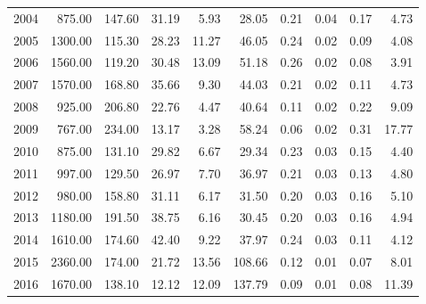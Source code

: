 \documentclass{article}
\begin{document}
\begin{table}[H]
\begin{tabular}{rrrrrrrrrr}
  2004 & 875.00 & 147.60 & 31.19 & 5.93 & 28.05 & 0.21 & 0.04 & 0.17 & 4.73 \\
  2005 & 1300.00 & 115.30 & 28.23 & 11.27 & 46.05 & 0.24 & 0.02 & 0.09 & 4.08 \\
  2006 & 1560.00 & 119.20 & 30.48 & 13.09 & 51.18 & 0.26 & 0.02 & 0.08 & 3.91 \\
  2007 & 1570.00 & 168.80 & 35.66 & 9.30 & 44.03 & 0.21 & 0.02 & 0.11 & 4.73 \\
  2008 & 925.00 & 206.80 & 22.76 & 4.47 & 40.64 & 0.11 & 0.02 & 0.22 & 9.09 \\
  2009 & 767.00 & 234.00 & 13.17 & 3.28 & 58.24 & 0.06 & 0.02 & 0.31 & 17.77 \\
  2010 & 875.00 & 131.10 & 29.82 & 6.67 & 29.34 & 0.23 & 0.03 & 0.15 & 4.40 \\
  2011 & 997.00 & 129.50 & 26.97 & 7.70 & 36.97 & 0.21 & 0.03 & 0.13 & 4.80 \\
  2012 & 980.00 & 158.80 & 31.11 & 6.17 & 31.50 & 0.20 & 0.03 & 0.16 & 5.10 \\
  2013 & 1180.00 & 191.50 & 38.75 & 6.16 & 30.45 & 0.20 & 0.03 & 0.16 & 4.94 \\
  2014 & 1610.00 & 174.60 & 42.40 & 9.22 & 37.97 & 0.24 & 0.03 & 0.11 & 4.12 \\
  2015 & 2360.00 & 174.00 & 21.72 & 13.56 & 108.66 & 0.12 & 0.01 & 0.07 & 8.01 \\
  2016 & 1670.00 & 138.10 & 12.12 & 12.09 & 137.79 & 0.09 & 0.01 & 0.08 & 11.39 \\
   \hline
\end{tabular}
\end{table}
\end{document}
